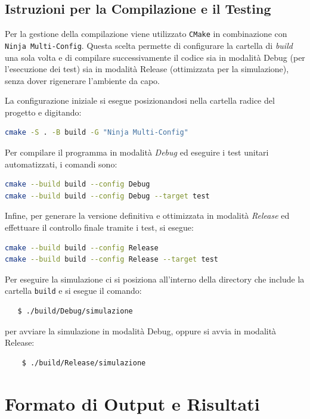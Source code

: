 \documentclass[11pt, a4paper]{article}
\begin{document}
\subsection{Istruzioni per la Compilazione e il Testing}
Per la gestione della compilazione viene utilizzato \texttt{CMake} in combinazione con \texttt{Ninja Multi-Config}. Questa scelta permette di configurare la cartella di \textit{build} una sola volta e di compilare successivamente il codice sia in modalità Debug (per l'esecuzione dei test) sia in modalità Release (ottimizzata per la simulazione), senza dover rigenerare l'ambiente da capo.

La configurazione iniziale si esegue posizionandosi nella cartella radice del progetto e digitando:
\begin{lstlisting}[language=bash]
cmake -S . -B build -G "Ninja Multi-Config"
\end{lstlisting}

Per compilare il programma in modalità \textit{Debug} ed eseguire i test unitari automatizzati, i comandi sono:
\begin{lstlisting}[language=bash]
cmake --build build --config Debug
cmake --build build --config Debug --target test
\end{lstlisting}

Infine, per generare la versione definitiva e ottimizzata in modalità \textit{Release} ed effettuare il controllo finale tramite i test, si esegue:
\begin{lstlisting}[language=bash]
cmake --build build --config Release
cmake --build build --config Release --target test
\end{lstlisting}
Per eseguire la simulazione ci si posiziona all'interno della directory che include la cartella \texttt{build} e si esegue il comando:
\begin{lstlisting}
   $ ./build/Debug/simulazione 
\end{lstlisting}
per avviare la simulazione in modalità Debug, oppure si avvia in modalità Release:
\begin{lstlisting}
    $ ./build/Release/simulazione
\end{lstlisting}

\section{Formato di Output e Risultati}
\label{sec:io}
\end{document}
